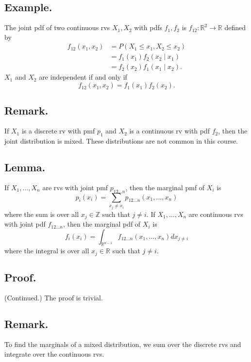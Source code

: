 \documentclass[titlepage]{article}
\begin{document}
\subsection{Example.} The joint pdf of two continuous rvs $X_{1}, X_{2}$ with pdfs $f_{1}, f_{2}$ is $f_{12}: \mathbb{R}^{2} \to \mathbb{R}$ defined by
\begin{align*}
    f_{12}(x_{1}, x_{2}) &= P(X_{1} \leq x_{1}, X_{2} \leq x_{2}) \\
                         &= f_{1}(x_{1})f_{2}(x_{2} \mid x_{1}) \\
                         &= f_{2}(x_{2})f_{1}(x_{1} \mid x_{2}).
\end{align*}
$X_{1}$ and $X_{2}$ are independent if and only if
$$f_{12}(x_{1}, x_{2}) = f_{1}(x_{1})f_{2}(x_{2}).$$

\subsection{Remark.} If $X_{1}$ is a discrete rv with pmf $p_{1}$ and $X_{2}$ is a continuous rv with pdf $f_{2}$, then the joint distribution is mixed. These distributions are not common in this course.

\subsection{Lemma.} If $X_{1}, \ldots, X_{n}$ are rvs with joint pmf $p_{12\ldots n}$, then the marginal pmf of $X_{i}$ is
$$p_{i}(x_{i}) = \sum_{x_{j} \neq x_{i}}p_{12\ldots n}(x_{1}, \ldots, x_{n})$$
where the sum is over all $x_{j} \in \mathbb{Z}$ such that $j \neq i$. If $X_{1}, \ldots, X_{n}$ are continuous rvs with joint pdf $f_{12\ldots n}$, then the marginal pdf of $X_{i}$ is
$$f_{i}(x_{i}) = \int_{\mathbb{R}^{n-1}}f_{12\ldots n}(x_{1}, \ldots, x_{n})dx_{j \neq i}$$
where the integral is over all $x_{j} \in \mathbb{R}$ such that $j \neq i$.

\subsection{Proof.} (Continued.) The proof is trivial.

\subsection{Remark.} To find the marginals of a mixed distribution, we sum over the discrete rvs and integrate over the continuous rvs.
\end{document}
